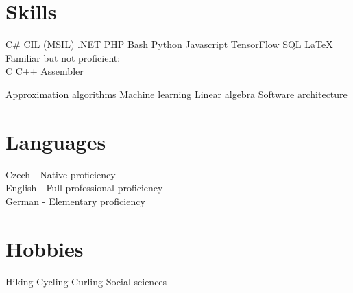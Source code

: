 \documentclass[a4paper]{deedy-resume} %
\begin{document}
\begin{minipage}[t]{0.33\textwidth}

\section{Skills}


C\# \textbullet{} CIL (MSIL) \textbullet{} .NET \textbullet{} PHP \textbullet{} Bash \textbullet{} Python \textbullet{}
Javascript \textbullet{} TensorFlow \textbullet{} SQL \textbullet{} \LaTeX\ \\ 
\halfsectionspace %
Familiar but not proficient: \\
C \textbullet{} C++ \textbullet{} Assembler

\sectionspace %


Approximation algorithms \textbullet{} Machine learning \textbullet{} Linear algebra \textbullet{} Software architecture

\sectionspace %

\section{Languages}

Czech - Native proficiency \\
English - Full professional proficiency \\
German - Elementary proficiency

\sectionspace %

\section{Hobbies}

Hiking \textbullet{} Cycling \textbullet{} Curling \textbullet{} Social sciences

\sectionspace %


\end{minipage} %
\hfill
%
\end{document}
